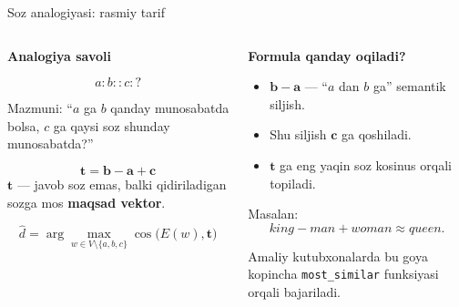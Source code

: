 \documentclass[aspectratio=169,11pt]{beamer}
\begin{document}
\begin{frame}{So\textquotesingle{}z analogiyasi: rasmiy ta\textquotesingle{}rif}
\small

\begin{columns}[T,totalwidth=\textwidth]
\begin{column}{0.52\textwidth}

\textbf{Analogiya savoli}

\vspace{3pt}
\[
a:b::c:?
\]

\footnotesize
Mazmuni: “$a$ ga $b$ qanday munosabatda bo\textquotesingle{}lsa,
$c$ ga qaysi so\textquotesingle{}z shunday munosabatda?”

\vspace{6pt}

\begin{tcolorbox}[defbox]
\[
\mathbf{t}
=
\mathbf{b}-\mathbf{a}+\mathbf{c}
\]
\footnotesize
$\mathbf{t}$ — javob so\textquotesingle{}z emas, balki qidiriladigan
so\textquotesingle{}zga mos \textbf{maqsad vektor}.
\end{tcolorbox}

\vspace{4pt}

\[
\hat{d}
=
\arg\max_{w\in V\setminus\{a,b,c\}}
\cos\bigl(E(w),\mathbf{t}\bigr)
\]

\end{column}

\begin{column}{0.44\textwidth}

\textbf{Formula qanday o\textquotesingle{}qiladi?}

\vspace{4pt}
\begin{itemize}\setlength\itemsep{5pt}
  \item $\mathbf{b}-\mathbf{a}$ — “$a$ dan $b$ ga” semantik siljish.
  \item Shu siljish $\mathbf{c}$ ga qo\textquotesingle{}shiladi.
  \item $\mathbf{t}$ ga eng yaqin so\textquotesingle{}z kosinus orqali topiladi.
\end{itemize}

\vspace{5pt}

\begin{tcolorbox}[defbox]
\footnotesize
Masalan:
\[
\textit{king}-\textit{man}+\textit{woman}
\approx
\textit{queen}.
\]
\end{tcolorbox}

\vspace{3pt}
\footnotesize
Amaliy kutubxonalarda bu g\textquotesingle{}oya ko\textquotesingle{}pincha
\texttt{most\_similar} funksiyasi orqali bajariladi.

\end{column}
\end{columns}

\end{frame}
\end{document}
